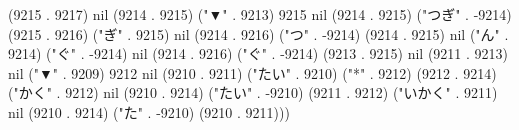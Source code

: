 (9215 . 9217) nil (9214 . 9215) ("▼" . 9213) 9215 nil (9214 . 9215) ("つぎ" . -9214) (9215 . 9216) ("ぎ" . 9215) nil (9214 . 9216) ("つ" . -9214) (9214 . 9215) nil ("ん" . 9214) ("ぐ" . -9214) nil (9214 . 9216) ("ぐ" . -9214) (9213 . 9215) nil (9211 . 9213) nil ("▼" . 9209) 9212 nil (9210 . 9211) ("たい" . 9210) ("*" . 9212) (9212 . 9214) ("かく" . 9212) nil (9210 . 9214) ("たい" . -9210) (9211 . 9212) ("いかく" . 9211) nil (9210 . 9214) ("た" . -9210) (9210 . 9211)))
